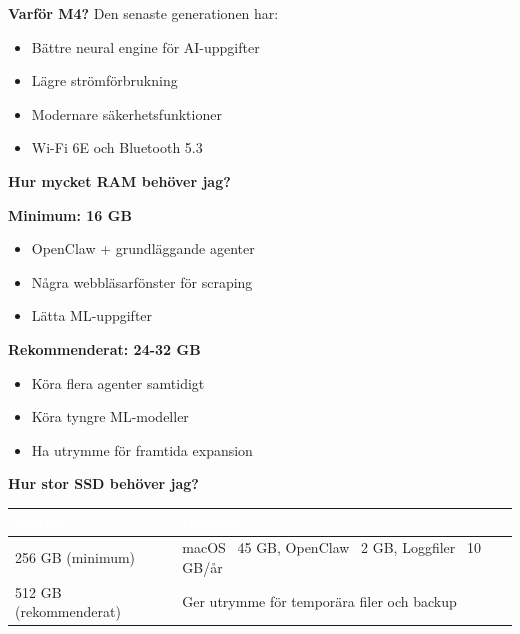 \documentclass[12pt,a4paper,swedish]{article}
\begin{document}
\bigskip

\textbf{Varför M4?} Den senaste generationen har:
\begin{itemize}
    \item Bättre neural engine för AI-uppgifter
    \item Lägre strömförbrukning
    \item Modernare säkerhetsfunktioner
    \item Wi-Fi 6E och Bluetooth 5.3
\end{itemize}

\bigskip

\textbf{Hur mycket RAM behöver jag?}

\begin{center}
\begin{minipage}{0.45\textwidth}
\textbf{Minimum: 16 GB}
\begin{itemize}
    \item OpenClaw + grundläggande agenter
    \item Några webbläsarfönster för scraping
    \item Lätta ML-uppgifter
\end{itemize}
\end{minipage}
\hfill
\begin{minipage}{0.45\textwidth}
\textbf{Rekommenderat: 24-32 GB}
\begin{itemize}
    \item Köra flera agenter samtidigt
    \item Köra tyngre ML-modeller
    \item Ha utrymme för framtida expansion
\end{itemize}
\end{minipage}
\end{center}

\bigskip

\textbf{Hur stor SSD behöver jag?}

\begin{center}
\begin{tabular}{|l|l|}
\hline
\rowcolor{secondary}
\textcolor{white}{\textbf{Storlek}} & \textcolor{white}{\textbf{Innehåll}} \\
\hline
256 GB (minimum) & macOS ~45 GB, OpenClaw ~2 GB, Loggfiler ~10 GB/år \\
\hline
512 GB (rekommenderat) & Ger utrymme för temporära filer och backup \\
\hline
\end{tabular}
\end{center}
\end{document}

